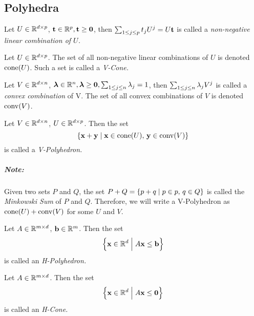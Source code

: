 \chapter{\MWT}

\section{Polyhedra}

\begin{Def}{
		Let $\mU$, $\tv, \t \geq \0$, then \( \tusum = U\t\) is called a \em{non-negative linear combination} of $U$.
	}\end{Def}

\begin{Def}[V-Cone]{
		Let $\mU$.  The set of all non-negative linear combinations of $U$ is denoted $\cone(U)$.  Such a set is called a \em{V-Cone}.
	}\end{Def}

\begin{Def}{
		Let $\mV$, $\lv, \l \geq\0, \lsum = 1$, then \( \lvsum \) is called a \textit{convex combination} of V.  The set of all convex combinations of $V$ is denoted $\conv(V)$.
	}\end{Def}

\begin{Def}[V-Polyhedron]{
		Let $\mV$, $\mU$.  Then the set
		\[ \set{\x + \y \st \x \in \cone(U),\, \y \in \conv(V)} \]
		is called a \em{V-Polyhedron}.
	}\end{Def}

\paragraph{Note:} Given two sets $P$ and $Q$, the set $P+Q = \set{p+q\st p\in p,\,q\in Q}$ is called the \textit{Minkowski Sum} of $P$ and $Q$.  Therefore, we will write a V-Polyhedron as $\cone(U) + \conv(V)$ for some $U$ and $V$.\\

\begin{Def}[H-Polyhedron]{
		Let $\mA$, $\bv$.  Then the set
		\[ \set{\xv \St A\x \leq \b} \]
		is called an \em{H-Polyhedron}.
	}\end{Def}

\begin{Def}[H-Cone]{
		Let $\mA$. Then the set
		\[ \set{\xv \St A\x \leq \0} \]
		is called an \em{H-Cone}.
	}\end{Def}

